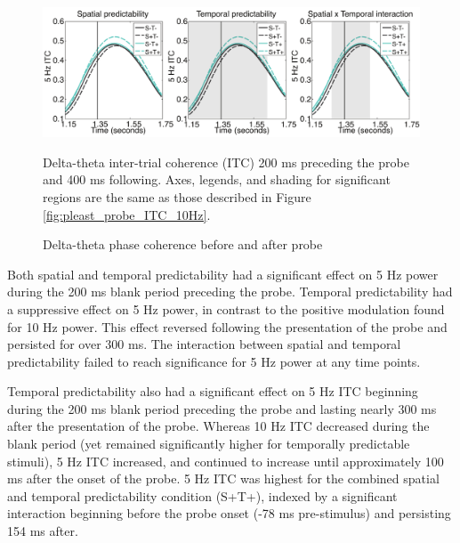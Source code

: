 \documentclass[dwyatte_dissertation.tex]{subfiles}
\begin{document}
\begin{figure}[h!]
\begin{center}
\includegraphics[width=160mm]{figs/chap_pleast/results_powphase_probe_5Hz_ITC_montage.pdf}
\end{center}
\caption{Delta-theta phase coherence before and after probe}{Delta-theta inter-trial coherence (ITC) 200 ms preceding the probe and 400 ms following. Axes, legends, and shading for significant regions are the same as those described in Figure \ref{fig:pleast_probe_ITC_10Hz}.}
\label{fig:pleast_probe_ITC_5Hz}
\end{figure}

Both spatial and temporal predictability had a significant effect on 5 Hz power during the 200 ms blank period preceding the probe. Temporal predictability had a  suppressive effect on 5 Hz power, in contrast to the positive modulation found for 10 Hz power. This effect reversed following the presentation of the probe and persisted for over 300 ms. The interaction between spatial and temporal predictability failed to reach significance for 5 Hz power at any time points.

Temporal predictability also had a significant effect on 5 Hz ITC beginning during the 200 ms blank period preceding the probe and lasting nearly 300 ms after the presentation of the probe. Whereas 10 Hz ITC decreased during the blank period (yet remained significantly higher for temporally predictable stimuli), 5 Hz ITC increased, and continued to increase until approximately 100 ms after the onset of the probe. 5 Hz ITC was highest for the combined spatial and temporal predictability condition (S+T+), indexed by a significant interaction beginning before the probe onset (-78 ms pre-stimulus) and persisting 154 ms after.

\end{document}
